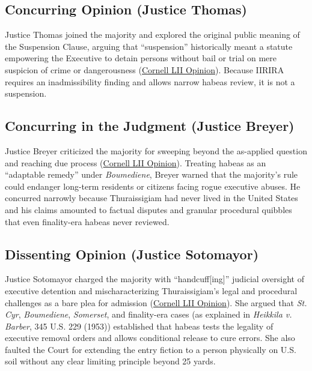 \documentclass[12pt]{article}
\begin{document}
\subsection{Concurring Opinion (Justice Thomas)}

Justice Thomas joined the majority and explored the original public meaning of the Suspension Clause, arguing that ``suspension'' historically meant a statute empowering the Executive to detain persons without bail or trial on mere suspicion of crime or dangerousness (\href{https://www.law.cornell.edu/supremecourt/text/19-161}{Cornell LII Opinion}). Because IIRIRA requires an inadmissibility finding and allows narrow habeas review, it is not a suspension.

\subsection{Concurring in the Judgment (Justice Breyer)}

Justice Breyer criticized the majority for sweeping beyond the as-applied question and reaching due process (\href{https://www.law.cornell.edu/supremecourt/text/19-161}{Cornell LII Opinion}). Treating habeas as an ``adaptable remedy'' under \textit{Boumediene}, Breyer warned that the majority's rule could endanger long-term residents or citizens facing rogue executive abuses. He concurred narrowly because Thuraissigiam had never lived in the United States and his claims amounted to factual disputes and granular procedural quibbles that even finality-era habeas never reviewed.

\subsection{Dissenting Opinion (Justice Sotomayor)}

Justice Sotomayor charged the majority with ``handcuff[ing]'' judicial oversight of executive detention and mischaracterizing Thuraissigiam's legal and procedural challenges as a bare plea for admission (\href{https://www.law.cornell.edu/supremecourt/text/19-161}{Cornell LII Opinion}). She argued that \textit{St. Cyr}, \textit{Boumediene}, \textit{Somerset}, and finality-era cases (as explained in \textit{Heikkila v. Barber}, 345 U.S. 229 (1953)) established that habeas tests the legality of executive removal orders and allows conditional release to cure errors. She also faulted the Court for extending the entry fiction to a person physically on U.S. soil without any clear limiting principle beyond 25 yards.
\end{document}

